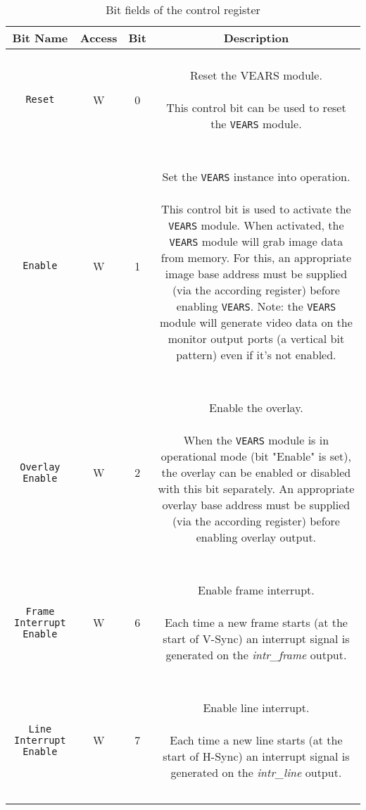 \begin{longtable}[htb]{|c|c|c|c|}
\hline 
\textbf{Bit Name} & \textbf{Access} & \textbf{Bit} & \textbf{Description} \\
\hline
\endhead

\texttt{Reset} & W & 0 &
\parbox{7cm}{ ~ \\ Reset the VEARS module. \\ ~ \\ \small
This control bit can be used to reset the \texttt{VEARS} module.
\\ ~ } \\

\hline 

\texttt{Enable} & W & 1 &
\parbox{7cm}{ ~ \\ Set the \texttt{VEARS} instance into operation. \\ ~ \\ \small
This control bit is used to activate the \texttt{VEARS} module. When activated, the \texttt{VEARS} module will grab image data from memory. For this, an appropriate image base address must be supplied (via the according register) before enabling \texttt{VEARS}. Note: the \texttt{VEARS} module will generate video data on the monitor output ports (a vertical bit pattern) even if it's not enabled.
\\ ~ } \\

\hline 

\texttt{Overlay Enable} & W & 2 &
\parbox{7cm}{ ~ \\ Enable the overlay. \\ ~ \\ \small
When the \texttt{VEARS} module is in operational mode (bit "Enable" is set), the overlay can be enabled or disabled with this bit separately. An appropriate overlay base address must be supplied (via the according register) before enabling overlay output.
\\ ~ } \\

\hline

\texttt{Frame Interrupt Enable} & W & 6 &
\parbox{7cm}{ ~ \\ Enable frame interrupt. \\ ~ \\ \small
Each time a new frame starts (at the start of V-Sync) an interrupt signal is generated on the \textit{intr\_frame} output.
\\ ~ } \\

\hline 

\texttt{Line Interrupt Enable} & W & 7 &
\parbox{7cm}{ ~ \\ Enable line interrupt. \\ ~ \\ \small
Each time a new line starts (at the start of H-Sync) an interrupt signal is generated on the \textit{intr\_line} output.
\\ ~ } \\

\hline

\caption{Bit fields of the control register}
\label{07-vears-control-bits}
\end{longtable}
